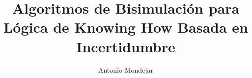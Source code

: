 \documentclass[a4paper,12pt,oneside,openright]{report}
\begin{document}
\title{Algoritmos de Bisimulación para Lógica de Knowing How Basada en Incertidumbre}

\author{Antonio Mondejar}

\maketitle

{\hypersetup{linkcolor=black}%
\tableofcontents}
\cleardoublepage









        









\end{document}
